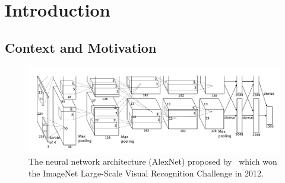 \chapter{Introduction}
\label{chapter:ch1-introduction}
\localtableofcontents

\section{Context and Motivation}
\label{section:ch1-context_and_motivation}



\begin{figure}[t]
  \centering
  \includegraphics[scale=0.24]{figures/main/ch1-introduction/alexnet.png}
  \caption{The neural network architecture (AlexNet) proposed by~\citet{krizhevsky2012imagenet} which won the ImageNet Large-Scale Visual Recognition Challenge in 2012.}
  \label{figure:ch1-alexnet_network}
\end{figure}

